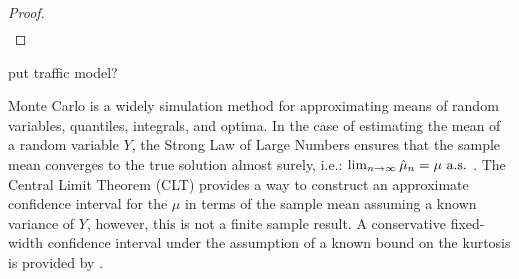 \documentclass{iitthesis}
\begin{document}
\begin{proof}
\begin{align}
\end{align}
%
% 
\end{proof}

put traffic model?


\label{chapter:meanMCberg}
Monte Carlo is a widely simulation method for approximating means of random variables, quantiles, integrals, and optima. In the case of estimating the mean of a random variable $Y$, the Strong Law of Large Numbers ensures that the sample mean converges to the true solution almost surely, i.e.: $\lim_{n \to \infty} \hat{\mu}_n =\mu \text{ a.s.}$ \cite[Theorem 20.1]{JP04}.  The Central Limit Theorem (CLT) provides a way to construct an approximate confidence interval for the $\mu$ in terms of the sample mean assuming a known variance of $Y$, however, this is not a finite sample result.  A conservative fixed-width confidence interval under the assumption of a known bound on the kurtosis is provided by \cite{HJLO12}.
\end{document}

